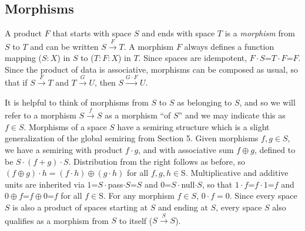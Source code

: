 \documentclass[11pt]{article}
\begin{document}
\subsection{Morphisms} 

A product $F$ that starts with space $S$ and ends with space $T$ is a {\it morphism} from $S$ to $T$ and can be written $S{\overset F\longrightarrow}T$.
A morphism $F$ always defines a function mapping ($S:X$) in $S$ to ($T:F:X$) in $T$.  Since spaces are idempotent, $F\cdot S$=$T\cdot F$=$F$.  Since the product of data is 
associative, morphisms can be composed as usual, so that if $S{\overset F\longrightarrow}T$ and 
$T{\overset G\longrightarrow}U$, then $S{\overset {G\cdot F}\longrightarrow}U$.  

     It is helpful to think of morphisms from $S$ to $S$ as belonging to $S$, and so we will refer to a morphism $S{\overset f\longrightarrow}S$ as a morphism ``of $S$'' and we may indicate this as $f\in S$.
Morphisms of a space $S$ have a semiring structure which is a slight generalization of the global semiring from Section 5.  Given morphisms $f, g\in S$, we have a semiring with 
product $f\cdot g$, and with associative sum $f\oplus g$, defined to be $S\cdot (f+g) \cdot S$.  
Distribution from the right follows as before, so $(f\oplus g)\cdot h = (f\cdot h)\oplus (g\cdot h)$ for all $f,g,h\in$S.  
Multiplicative and additive units are inherited via $1$=$S\cdot${\rm pass}$\cdot S$=$S$ and $0$=$S\cdot${\rm null}$\cdot S$, so that 
$1\cdot f$=$f\cdot 1$=$f$ and $0\oplus f$=$f\oplus 0$=$f$ for all $f\in$S.  For any morphism $f\in S$, $0\cdot f=0$.  
Since every space $S$ is also a product of spaces starting at $S$ and ending at $S$, every space $S$ also qualifies as a morphism from $S$ to itself ($S{\overset S\rightarrow}S$).
\end{document}
